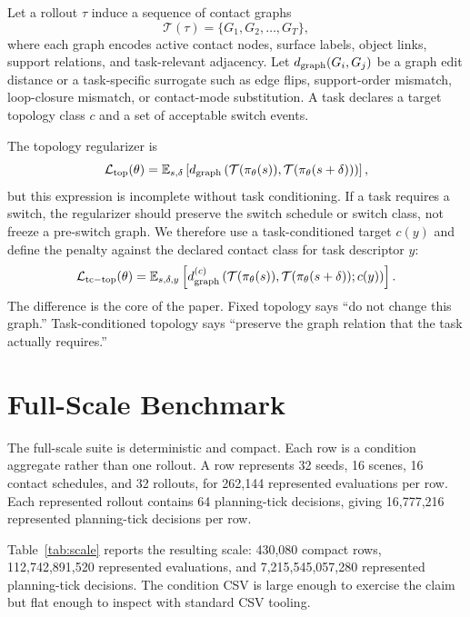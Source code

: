 \documentclass{article}
\newcommand{\ctop}{\mathcal{T}}
\newcommand{\pol}{\pi_\theta}
\newcommand{\ged}{d_{\rm graph}}
\begin{document}
Let a rollout $\tau$ induce a sequence of contact graphs
\[
    \ctop(\tau) = \{G_1, G_2, \ldots, G_T\},
\]
where each graph encodes active contact nodes, surface labels, object links, support relations, and task-relevant adjacency. Let $\ged(G_i, G_j)$ be a graph edit distance or a task-specific surrogate such as edge flips, support-order mismatch, loop-closure mismatch, or contact-mode substitution. A task declares a target topology class $c$ and a set of acceptable switch events.

The topology regularizer is
\[
    \mathcal{L}_{\rm top}(\theta)
    = \mathbb{E}_{s,\delta}\left[
    \ged\left(\ctop(\pol(s)), \ctop(\pol(s+\delta))\right)
    \right],
\]
but this expression is incomplete without task conditioning. If a task requires a switch, the regularizer should preserve the switch schedule or switch class, not freeze a pre-switch graph. We therefore use a task-conditioned target $c(y)$ and define the penalty against the declared contact class for task descriptor $y$:
\[
    \mathcal{L}_{\rm tc-top}(\theta)
    = \mathbb{E}_{s,\delta,y}\left[
    \ged^{(c)}\left(\ctop(\pol(s)), \ctop(\pol(s+\delta)); c(y)\right)
    \right].
\]
The difference is the core of the paper. Fixed topology says ``do not change this graph.'' Task-conditioned topology says ``preserve the graph relation that the task actually requires.''

\section{Full-Scale Benchmark}

The full-scale suite is deterministic and compact. Each row is a condition aggregate rather than one rollout. A row represents 32 seeds, 16 scenes, 16 contact schedules, and 32 rollouts, for 262,144 represented evaluations per row. Each represented rollout contains 64 planning-tick decisions, giving 16,777,216 represented planning-tick decisions per row.

\begin{table}[t]
\centering
\small
\resizebox{\linewidth}{!}{}
\caption{Full-scale benchmark size. Rows are streamed to disk and summarized online to keep RAM use small.}
\label{tab:scale}
\end{table}

Table~\ref{tab:scale} reports the resulting scale: 430,080 compact rows, 112,742,891,520 represented evaluations, and 7,215,545,057,280 represented planning-tick decisions. The condition CSV is large enough to exercise the claim but flat enough to inspect with standard CSV tooling.
\end{document}
